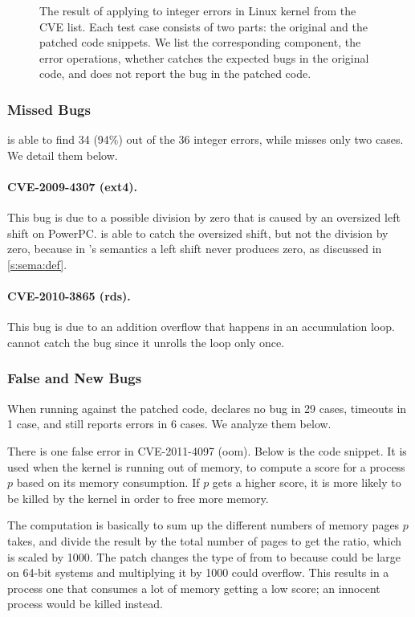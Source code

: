 \begin{figure*}
\centering
\footnotesize

\caption{The result of applying \sys to integer errors in Linux
kernel from the CVE list.  Each test case consists of two parts:
the original and the patched code snippets.  We list the corresponding
component, the error operations, whether \sys catches the expected
bugs in the original code, and does not report the bug in the patched
code.}
\label{f:data:cve}
\end{figure*}

\subsubsection{Missed Bugs}

\sys is able to find 34 (94\%) out of the 36 integer errors, while
misses only two cases.  We detail them below.

\paragraph{CVE-2009-4307 (ext4).}
This bug is due to a possible division by zero that is caused by
an oversized left shift on PowerPC.  \sys is able to catch the
oversized shift, but not the division by zero, because in \sys's
semantics a left shift never produces zero, as discussed in
\autoref{s:sema:def}.

\paragraph{CVE-2010-3865 (rds).}
This bug is due to an addition overflow that happens in an accumulation
loop.  \sys cannot catch the bug since it unrolls the loop only
once.

\subsubsection{False and New Bugs}

When running against the patched code, \sys declares no bug in 29
cases, timeouts in 1 case, and still reports errors in 6 cases.
We analyze them below.

There is one false error in CVE-2011-4097 (oom).  Below is the code
snippet.  It is used when the kernel is running out of memory, to
compute a score for a process $p$ based on its memory consumption.
If $p$ gets a higher score, it is more likely to be killed by the
kernel in order to free more memory.

The computation is basically to sum up the different numbers of
memory pages $p$ takes, and divide the result by the total number
of pages to get the ratio, which is scaled by 1000.  The patch
changes the type of  from  to  because
 could be large on 64-bit systems and multiplying it by
1000 could overflow.  This results in a process one that consumes
a lot of memory getting a low score; an innocent process would be
killed instead.

